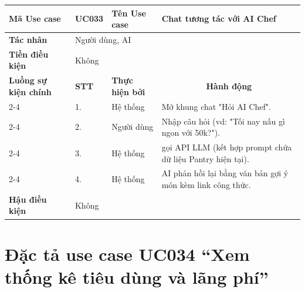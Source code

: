 \begin{longtable}{|p{2.7cm}|p{0.8cm}|p{2.6cm}|p{7.3cm}|}
\hline
\cellcolor[HTML]{D5F5E3}\textbf{Mã Use case} & \multicolumn{1}{l|}{UC033} & \cellcolor[HTML]{D5F5E3}\textbf{Tên Use case} & Chat tương tác với AI Chef \\ \hline
\cellcolor[HTML]{D5F5E3}\textbf{Tác nhân} & \multicolumn{3}{p{10.7cm}|}{Người dùng, AI} \\ \hline
\cellcolor[HTML]{D5F5E3}\textbf{Tiền điều kiện} & \multicolumn{3}{p{10.7cm}|}{Không} \\ \hline

\cellcolor[HTML]{D5F5E3}\textbf{Luồng sự kiện chính} & \cellcolor[HTML]{FDEBD0}\textbf{STT} & \cellcolor[HTML]{FDEBD0}\textbf{Thực hiện bởi} & \multicolumn{1}{c|}{\cellcolor[HTML]{FDEBD0}\textbf{Hành động}} \\ \cline{2-4} 
\cellcolor[HTML]{D5F5E3} & 1. & Hệ thống & Mở khung chat "Hỏi AI Chef". \\ \cline{2-4} 
\cellcolor[HTML]{D5F5E3} & 2. & Người dùng & Nhập câu hỏi (vd: "Tối nay nấu gì ngon với 50k?"). \\ \cline{2-4} 
\cellcolor[HTML]{D5F5E3} & 3. & Hệ thống & gọi API LLM (kết hợp prompt chứa dữ liệu Pantry hiện tại). \\ \cline{2-4} 
\cellcolor[HTML]{D5F5E3} & 4. & Hệ thống & AI phản hồi lại bằng văn bản gợi ý món kèm link công thức. \\ \hline

\cellcolor[HTML]{D5F5E3}\textbf{Hậu điều kiện} & \multicolumn{3}{p{10.7cm}|}{Không} \\ \hline
\end{longtable}
\endgroup

\section{Đặc tả use case UC034 ``Xem thống kê tiêu dùng và lãng phí''}
\vspace{0.5cm}

\begingroup
\renewcommand{\arraystretch}{1.5}

